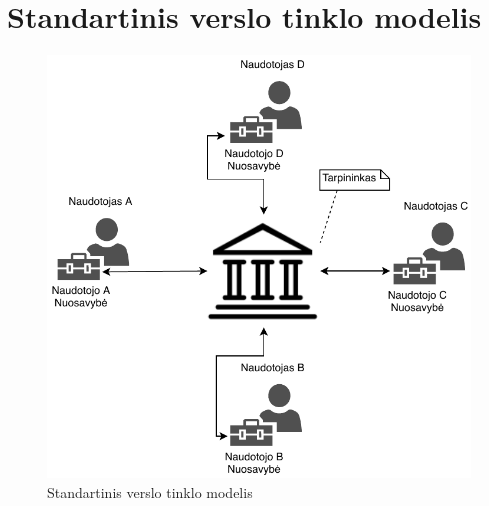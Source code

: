 \documentclass{VUMIFPSkursinis}
\begin{document}
\appendix 

\section{Standartinis verslo tinklo modelis}
\begin{figure}[H]
    \centering
    \includegraphics[scale=0.9]{img/pav-1.pdf}
    \caption{Standartinis verslo tinklo modelis}
    \label{img:pav-1}
\end{figure}
\end{document}
